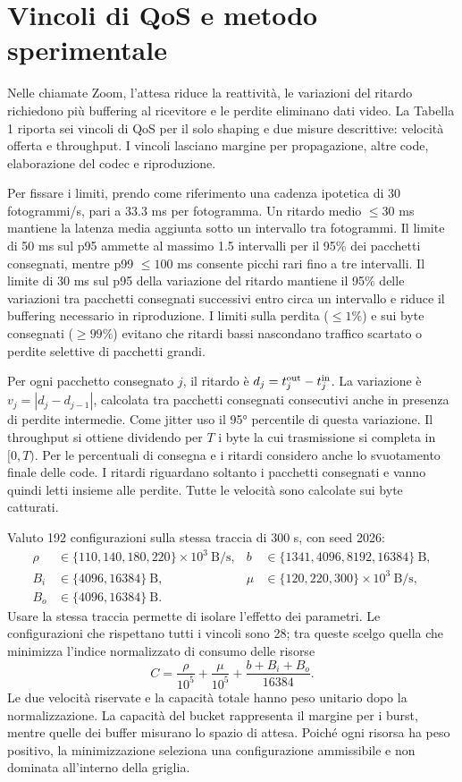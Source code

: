 \documentclass[10pt,a4paper]{article}
\begin{document}
\section{Vincoli di QoS e metodo sperimentale}
Nelle chiamate Zoom, l'attesa riduce la reattività, le variazioni del ritardo
richiedono più buffering al ricevitore e le perdite eliminano dati video.
La Tabella 1 riporta sei vincoli di QoS per il solo shaping e due misure descrittive:
velocità offerta e throughput. I vincoli lasciano margine per propagazione, altre
code, elaborazione del codec e riproduzione.

Per fissare i limiti, prendo come riferimento una cadenza ipotetica di 30 fotogrammi/s,
pari a 33.3 ms per fotogramma. Un ritardo medio $\leq30$ ms mantiene la latenza media
aggiunta sotto un intervallo tra fotogrammi. Il limite di 50 ms sul p95 ammette
al massimo 1.5 intervalli per il 95\% dei pacchetti consegnati, mentre p99 $\leq100$ ms
consente picchi rari fino a tre intervalli. Il limite di 30 ms sul p95 della variazione
del ritardo mantiene il 95\% delle variazioni tra pacchetti consegnati successivi
entro circa un intervallo e riduce il buffering necessario in riproduzione.
I limiti sulla perdita ($\leq1\%$) e sui byte consegnati ($\geq99\%$) evitano che
ritardi bassi nascondano traffico scartato o perdite selettive di pacchetti grandi.

Per ogni pacchetto consegnato $j$, il ritardo è $d_j=t_j^{\rm out}-t_j^{\rm in}$.
La variazione è $v_j=|d_j-d_{j-1}|$, calcolata tra pacchetti consegnati consecutivi
anche in presenza di perdite intermedie. Come jitter uso il 95° percentile di questa
variazione. Il throughput si ottiene dividendo per $T$ i byte la cui trasmissione
si completa in $[0,T)$. Per le percentuali di consegna e i ritardi considero anche
lo svuotamento finale delle code. I ritardi riguardano soltanto i pacchetti consegnati
e vanno quindi letti insieme alle perdite. Tutte le velocità sono calcolate sui byte
catturati.

Valuto 192 configurazioni sulla stessa traccia di 300 s, con seed 2026:
\[
\begin{aligned}
\rho&\in\{110,140,180,220\}\times10^3\ \mathrm{B/s},&
b&\in\{1341,4096,8192,16384\}\ \mathrm{B},\\
B_i&\in\{4096,16384\}\ \mathrm{B},&
\mu&\in\{120,220,300\}\times10^3\ \mathrm{B/s},\\
B_o&\in\{4096,16384\}\ \mathrm{B}.&&
\end{aligned}
\]
Usare la stessa traccia permette di isolare l'effetto dei parametri. Le configurazioni
che rispettano tutti i vincoli sono 28; tra queste scelgo quella che minimizza
l'indice normalizzato di consumo delle risorse
\[
C=\frac{\rho}{10^5}+\frac{\mu}{10^5}+\frac{b+B_i+B_o}{16384}.
\]
Le due velocità riservate e la capacità totale hanno peso unitario dopo la
normalizzazione. La capacità del bucket rappresenta il margine per i burst,
mentre quelle dei buffer misurano lo spazio di attesa. Poiché ogni risorsa ha
peso positivo, la minimizzazione seleziona una configurazione ammissibile e
non dominata all'interno della griglia.
\end{document}
